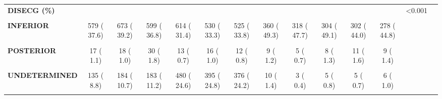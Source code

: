 \documentclass[
]{article}
\begin{document}
\begin{table}[H]
\begin{tabular}[t]{>{\raggedright\arraybackslash}p{5em}ccccccccccccc}
\textbf{DISECG (\%)} &  &  &  &  &  &  &  &  &  &  &  & <0.001 & \\
\textbf{\cellcolor{gray!10}{ANTERIOR}} & \cellcolor{gray!10}{687 ( 44.7)} & \cellcolor{gray!10}{724 ( 42.2)} & \cellcolor{gray!10}{664 ( 40.8)} & \cellcolor{gray!10}{691 ( 35.3)} & \cellcolor{gray!10}{531 ( 33.3)} & \cellcolor{gray!10}{532 ( 34.3)} & \cellcolor{gray!10}{316 ( 43.3)} & \cellcolor{gray!10}{308 ( 46.2)} & \cellcolor{gray!10}{278 ( 44.9)} & \cellcolor{gray!10}{347 ( 50.5)} & \cellcolor{gray!10}{289 ( 46.5)} & \cellcolor{gray!10}{} & \cellcolor{gray!10}{}\\
\textbf{INFERIOR} & 579 ( 37.6) & 673 ( 39.2) & 599 ( 36.8) & 614 ( 31.4) & 530 ( 33.3) & 525 ( 33.8) & 360 ( 49.3) & 318 ( 47.7) & 304 ( 49.1) & 302 ( 44.0) & 278 ( 44.8) &  & \\
\textbf{\cellcolor{gray!10}{LATERAL}} & \cellcolor{gray!10}{116 (  7.5)} & \cellcolor{gray!10}{112 (  6.5)} & \cellcolor{gray!10}{151 (  9.3)} & \cellcolor{gray!10}{151 (  7.7)} & \cellcolor{gray!10}{120 (  7.5)} & \cellcolor{gray!10}{105 (  6.8)} & \cellcolor{gray!10}{33 (  4.5)} & \cellcolor{gray!10}{33 (  4.9)} & \cellcolor{gray!10}{24 (  3.9)} & \cellcolor{gray!10}{21 (  3.1)} & \cellcolor{gray!10}{39 (  6.3)} & \cellcolor{gray!10}{} & \cellcolor{gray!10}{}\\
\textbf{POSTERIOR} & 17 (  1.1) & 18 (  1.0) & 30 (  1.8) & 13 (  0.7) & 16 (  1.0) & 12 (  0.8) & 9 (  1.2) & 5 (  0.7) & 8 (  1.3) & 11 (  1.6) & 9 (  1.4) &  & \\
\textbf{\cellcolor{gray!10}{RIGHT VENTRICLE}} & \cellcolor{gray!10}{4 (  0.3)} & \cellcolor{gray!10}{5 (  0.3)} & \cellcolor{gray!10}{2 (  0.1)} & \cellcolor{gray!10}{6 (  0.3)} & \cellcolor{gray!10}{1 (  0.1)} & \cellcolor{gray!10}{2 (  0.1)} & \cellcolor{gray!10}{2 (  0.3)} & \cellcolor{gray!10}{0 (  0.0)} & \cellcolor{gray!10}{0 (  0.0)} & \cellcolor{gray!10}{1 (  0.1)} & \cellcolor{gray!10}{0 (  0.0)} & \cellcolor{gray!10}{} & \cellcolor{gray!10}{}\\
\textbf{UNDETERMINED} & 135 (  8.8) & 184 ( 10.7) & 183 ( 11.2) & 480 ( 24.6) & 395 ( 24.8) & 376 ( 24.2) & 10 (  1.4) & 3 (  0.4) & 5 (  0.8) & 5 (  0.7) & 6 (  1.0) &  & \\
\textbf{\cellcolor{gray!10}{DISQW = YES (\%)}} & \cellcolor{gray!10}{901 ( 70.3)} & \cellcolor{gray!10}{891 ( 59.8)} & \cellcolor{gray!10}{891 ( 58.0)} & \cellcolor{gray!10}{743 ( 37.1)} & \cellcolor{gray!10}{529 ( 31.4)} & \cellcolor{gray!10}{517 ( 29.5)} & \cellcolor{gray!10}{445 ( 64.4)} & \cellcolor{gray!10}{357 ( 55.4)} & \cellcolor{gray!10}{375 ( 59.1)} & \cellcolor{gray!10}{348 ( 50.9)} & \cellcolor{gray!10}{304 ( 49.4)} & \cellcolor{gray!10}{<0.001} & \cellcolor{gray!10}{}\\

\end{tabular}
\end{table}
\end{document}
